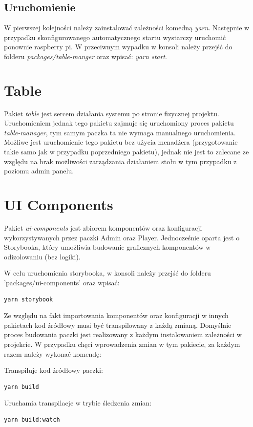 \subsection{Uruchomienie}
W pierwszej kolejności należy zainstalować zależności komedną \textit{yarn}. Następnie w przypadku skonfigurowanego automatycznego startu wystarczy uruchomić ponownie raspberry pi. W przeciwnym wypadku w konsoli należy przejść do folderu \textit{packages/table-manger} oraz wpisać: \textit{yarn start}.

\section{Table}
Pakiet \textit{table} jest sercem działania systemu po stronie fizycznej projektu. Uruchomieniem jednak tego pakietu zajmuje się uruchomiony proces pakietu \textit{table-manager}, tym samym paczka ta nie wymaga manualnego uruchomienia. Możliwe jest uruchomienie tego pakietu bez użycia menadżera (przygotowanie takie samo jak w przypadku poprzedniego pakietu), jednak nie jest to zalecane ze względu na brak możliwości zarządzania działaniem stołu w tym przypadku z poziomu admin panelu.

\section{UI Components}
Pakiet \textit{ui-components} jest zbiorem komponentów oraz konfiguracji wykorzystywanych przez paczki Admin oraz Player. Jednocześnie oparta jest o Storybooka, który umożliwia budowanie graficznych komponentów w odizolowaniu (bez logiki).

W celu uruchomienia storybooka, w konsoli należy przejść do folderu 'packages/ui-components' oraz wpisać:

\begin{lstlisting}
yarn storybook
\end{lstlisting}

Ze względu na fakt importowania komponentów oraz konfiguracji w innych pakietach kod źródłowy musi być transpilowany z każdą zmianą. Domyślnie proces budowania paczki jest realizowany z każdym instalowaniem zależności w projekcie. W przypadku chęci wprowadzenia zmian w tym pakiecie, za każdym razem należy wykonać komendę:

Transpiluje kod źródłowy paczki:
\begin{lstlisting}
yarn build
\end{lstlisting}

Uruchamia transpilacje w trybie śledzenia zmian:
\begin{lstlisting}
yarn build:watch
\end{lstlisting}

